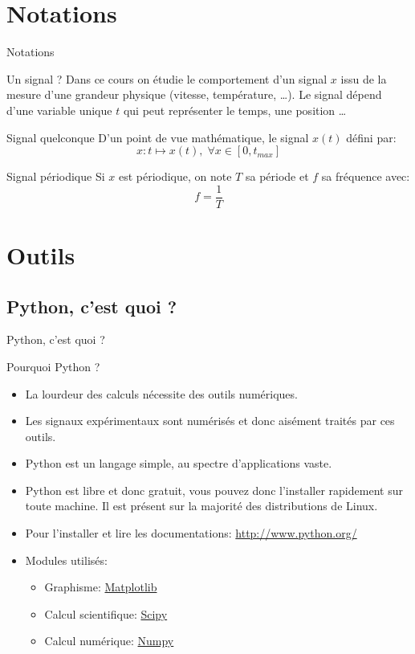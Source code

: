 \documentclass[8pt,a4paper]{beamer}
\begin{document}
\section{Notations}
\begin{frame}{Notations}
\begin{block}{Un signal ?}
Dans ce cours on étudie le comportement d'un signal $x$ issu de la mesure d'une grandeur physique (vitesse, température, \ldots). Le signal dépend d'une variable unique $t$ qui peut représenter le temps, une position \ldots 
\end{block}

\begin{block}{Signal quelconque}
D'un point de vue mathématique, le signal $x(t)$ défini par:
$$
x:t \longmapsto x(t), \; \forall x \in [0,t_{max}]
$$

\end{block}

\begin{block}{Signal périodique}
Si $x$ est périodique, on note $T$ sa période et $f$ sa fréquence avec:
$$
f = \frac{1}{T}
$$
\end{block}
\end{frame}

\section{Outils}
  \subsection{Python, c'est quoi ?}
  \begin{frame}{Python, c'est quoi ?}
  \begin{block}{Pourquoi Python ?}
  \begin{itemize}
  \item La lourdeur des calculs nécessite des outils numériques.
  \item Les signaux expérimentaux sont numérisés et donc aisément traités par ces outils.
  \item Python est un langage simple, au spectre d'applications vaste.
  \item Python est libre et donc gratuit, vous pouvez donc l'installer rapidement sur toute machine. Il est présent sur la majorité des distributions de Linux.
  \item Pour l'installer et lire les documentations: \href{http://www.python.org/}{http://www.python.org/}
  \item Modules utilisés: 
  \begin{itemize}
  \item Graphisme: \href{http://matplotlib.sourceforge.net/}{Matplotlib}
  \item Calcul scientifique: \href{http://www.scipy.org/}{Scipy}
  \item Calcul numérique: \href{http://numpy.scipy.org/}{Numpy}
  \end{itemize}
  \end{itemize}
  \end{block}
  \end{frame}
\end{document}

